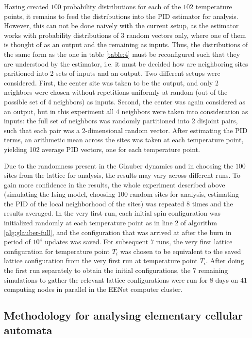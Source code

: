 \documentclass[12pt]{article}
\begin{document}
Having created $100$ probability distributions for each of the $102$ temperature points, it remains to feed the distributions into the PID estimator for analysis. However, this can not be done naively with the current setup, as the estimator works with probability distributions of 3 random vectors only, where one of them is thought of as an output and the remaining as inputs. Thus, the distributions of the same form as the one in table \ref{table:4} must be reconfigured such that they are understood by the estimator, i.e. it must be decided how are neighboring sites paritioned into 2 sets of inputs and an output. Two different setups were considered. First, the center site was taken to be the output, and only 2 neighbors were chosen without repetitions uniformly at random (out of the possible set of 4 neighbors) as inputs. Second, the center was again considered as an output, but in this experiment all 4 neighbors were taken into consideration as inputs: the full set of neighbors was randomly partitioned into 2 disjoint pairs, such that each pair was a 2-dimensional random vector. After estimating the PID terms, an arithmetic mean across the sites was taken at each temperature point, yielding 102 average PID vectors, one for each temperature point. 

Due to the randomness present in the Glauber dynamics and in choosing the $100$ sites from the lattice for analysis, the results may vary across different runs. To gain more confidence in the results, the whole experiment described above (simulating the Ising model, choosing 100 random sites for analysis, estimating the PID of the local neighborhood of the sites) was repeated 8 times and the results averaged. In the very first run, each initial spin configuration was initialized randomly at each temperature point as in line 2 of algorithm \ref{alg:glauber-full}, and the configuration that was arrived at after the burn in period of $10^4$ updates was saved. For subsequent 7 runs, the very first lattice configuration for temperature point $T_i$ was chosen to be equivalent to the saved lattice configuration from the very first run at temperature point $T_i$. After doing the first run separately to obtain the initial configurations, the 7 remaining simulations to gather the relevant lattice configurations were run for 8 days on 41 computing nodes in parallel in the EENet computer cluster.

\subsection{Methodology for analysing elementary cellular automata}
\end{document}
